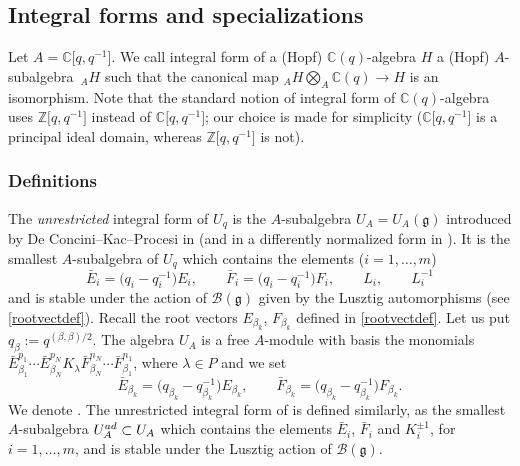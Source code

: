 \documentclass[11pt]{article}
\numberwithin{equation}{section}
\numberwithin{equation}{section}
\theoremstyle{definition}
\newcommand{\mc}{\mathbb{C}}
\newcommand{\mz}{\mathbb{Z}}
\newcommand{\ra}{\rightarrow}
\begin{document}
\subsection{Integral forms and specializations}\label{INTEG} Let $A=\mc\big[q,q^{-1}\big]$. We call integral form of a (Hopf) $\mc(q)$-algebra $H$ a (Hopf) $A$-subalgebra~${}_AH$ such that the canonical map ${}_AH\bigotimes_A \mc(q) \ra H$ is an isomorphism. Note that the standard notion of integral form of $\mc(q)$-algebra uses $\mz\big[q,q^{-1}\big]$ instead of $\mc\big[q,q^{-1}\big]$; our choice is made for simplicity ($\mc\big[q,q^{-1}\big]$ is a principal ideal domain, whereas $\mz\big[q,q^{-1}\big]$ is not).

\subsubsection{Definitions}\label{defintform} The {\it unrestricted} integral form of $U_q$ is the $A$-subalgebra $U_A = U_A(\mathfrak{g})$ introduced by De Concini--Kac--Procesi in \cite[Section 12]{DC-K-P2} (and in a differently normalized form in \cite{DC-K,DC-K-P1}). It is the smallest $A$-subalgebra of $U_q$ which contains the elements ($i=1,\dots,m$)
\begin{equation}\label{normgen0}
\bar{E}_i = \big(q_i-q_i^{-1}\big)E_i,\qquad \bar{F}_i = \big(q_i-q_i^{-1}\big)F_i,\qquad L_i,\qquad L_i^{-1}
\end{equation}
and is stable under the action of $\mathcal{B}(\mathfrak{g})$ given by the Lusztig automorphisms (see \eqref{rootvectdef}). Recall the root vectors $E_{\beta_k}$, $F_{\beta_k}$ defined in \eqref{rootvectdef}. Let us put $q_\beta := q^{(\beta,\beta)/2}$. The algebra $U_A$ is a free $A$-module with basis the monomials $\bar{E}_{\beta_1}^{p_1}\cdots \bar{E}_{\beta_N}^{p_N}K_\lambda \bar{F}_{\beta_N}^{n_N}\cdots \bar{F}_{\beta_1}^{n_1}$, where $\lambda \in P$ and we set
\[\bar{E}_{\beta_k}= \big(q_{\beta_k}-q_{\beta_k}^{-1}\big)E_{\beta_k},\qquad \bar{F}_{\beta_k}= \big(q_{\beta_k}-q_{\beta_k}^{-1}\big)F_{\beta_k}.\]
We denote .
The unrestricted integral form of  is defined similarly, as the smallest $A$-subalgebra $U_A^{\rm ad} \subset U_A$ which contains the elements $\bar{E}_i$, $\bar{F}_i$ and $K_i^{\pm 1}$, for $i=1,\dots,m$, and is stable under the Lusztig action of $\mathcal{B}(\mathfrak{g})$.
\end{document}

